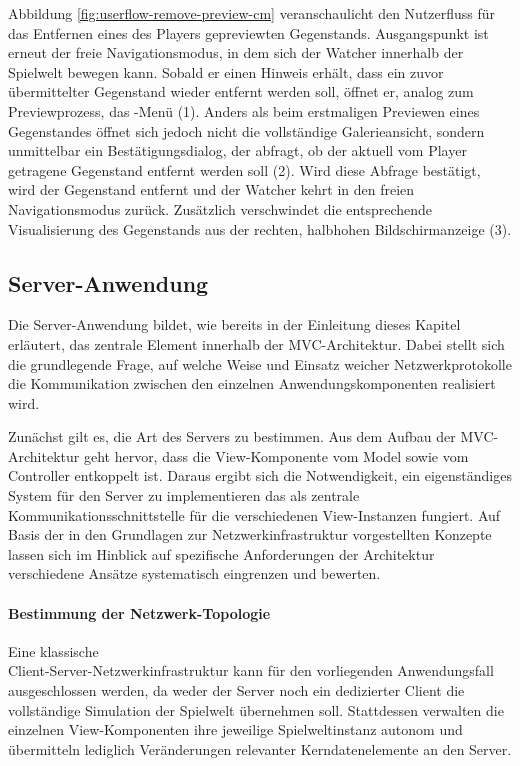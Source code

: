 Abbildung \ref{fig:userflow-remove-preview-cm} veranschaulicht den Nutzerfluss für das Entfernen eines des Players gepreviewten Gegenstands. Ausgangspunkt ist erneut der freie Navigationsmodus, in dem sich der Watcher innerhalb der Spielwelt bewegen kann. Sobald er einen Hinweis erhält, dass ein zuvor übermittelter Gegenstand wieder entfernt werden soll, öffnet er, analog zum Previewprozess, das -Menü (1). Anders als beim erstmaligen Previewen eines Gegenstandes öffnet sich jedoch nicht die vollständige Galerieansicht, sondern unmittelbar ein Bestätigungsdialog, der abfragt, ob der aktuell vom Player getragene Gegenstand entfernt werden soll (2). Wird diese Abfrage bestätigt, wird der Gegenstand entfernt und der Watcher kehrt in den freien Navigationsmodus zurück. Zusätzlich verschwindet die entsprechende Visualisierung des Gegenstands aus der rechten, halbhohen Bildschirmanzeige (3). 

\subsection{Server-Anwendung}

Die Server-Anwendung bildet, wie bereits in der Einleitung dieses Kapitel erläutert, das zentrale Element innerhalb der \ac{MVC}-Architektur. Dabei stellt sich die grundlegende Frage, auf welche Weise und Einsatz weicher Netzwerkprotokolle die Kommunikation zwischen den einzelnen Anwendungskomponenten realisiert wird.

Zunächst gilt es, die Art des Servers zu bestimmen. Aus dem Aufbau der \ac{MVC}-Architektur geht hervor, dass die View-Komponente vom Model sowie vom Controller entkoppelt ist. Daraus ergibt sich die Notwendigkeit, ein eigenständiges System für den Server zu implementieren das als zentrale Kommunikationsschnittstelle für die verschiedenen View-Instanzen fungiert. Auf Basis der in den Grundlagen zur Netzwerkinfrastruktur vorgestellten Konzepte lassen sich im Hinblick auf spezifische Anforderungen der Architektur verschiedene Ansätze systematisch eingrenzen und bewerten.

\paragraph{Bestimmung der Netzwerk-Topologie}

Eine klassische \\ Client-Server-Netzwerkinfrastruktur kann für den vorliegenden Anwendungsfall ausgeschlossen werden, da weder der Server noch ein dedizierter Client die vollständige Simulation der Spielwelt übernehmen soll. Stattdessen verwalten die einzelnen View-Komponenten ihre jeweilige Spielweltinstanz autonom und übermitteln lediglich Veränderungen relevanter Kerndatenelemente an den Server.


